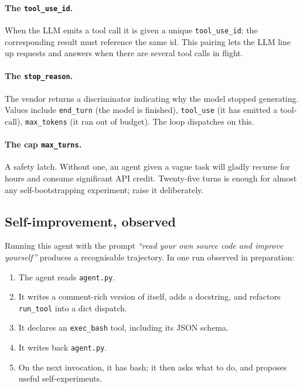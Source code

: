 \paragraph{The \texttt{tool\_use\_id}.}
When the LLM emits a tool call it is given a unique
\texttt{tool\_use\_id}; the corresponding result must reference
the same id.  This pairing lets the LLM line up requests and
answers when there are several tool calls in flight.

\paragraph{The \texttt{stop\_reason}.}
The vendor returns a discriminator indicating why the model
stopped generating.  Values include \texttt{end\_turn} (the
model is finished), \texttt{tool\_use} (it has emitted a
tool-call), \texttt{max\_tokens} (it ran out of budget).  The
loop dispatches on this.

\paragraph{The cap \texttt{max\_turns}.}
A safety latch.  Without one, an agent given a vague task
will gladly recurse for hours and consume significant API
credit.  Twenty-five turns is enough for almost any
self-bootstrapping experiment; raise it deliberately.

\subsection{Self-improvement, observed}

Running this agent with the prompt
\emph{``read your own source code and improve yourself''}
produces a recognisable trajectory.  In one run observed in
preparation:

\begin{enumerate}[(1)]
  \item The agent reads \texttt{agent.py}.
  \item It writes a comment-rich version of itself, adds a
    docstring, and refactors \texttt{run\_tool} into a dict
    dispatch.
  \item It declares an \texttt{exec\_bash} tool, including
    its JSON schema.
  \item It writes back \texttt{agent.py}.
  \item On the next invocation, it has bash; it then asks
    what to do, and proposes useful self-experiments.
\end{enumerate}

